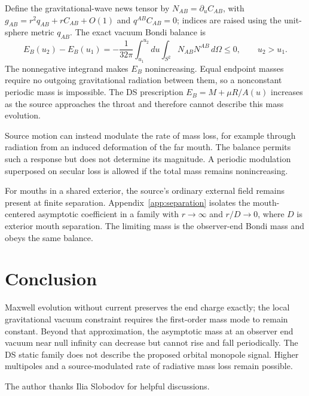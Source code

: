 \documentclass[aps,prd,10pt,onecolumn,nofootinbib,superscriptaddress,floatfix]{revtex4-2}
\begin{document}
Define the gravitational-wave news tensor by $N_{AB}=\partial_u C_{AB}$,
with $g_{AB}=r^2q_{AB}+rC_{AB}+O(1)$ and $q^{AB}C_{AB}=0$;
indices are raised using the unit-sphere metric $q_{AB}$.
The exact vacuum Bondi balance is
\cite{BondiVanderBurgMetzner1962Gravitational,Sachs1962Asymptotic,
WaldZoupas2000Conserved}
\begin{equation}
 E_B(u_2)-E_B(u_1)
 =-\frac{1}{32\pi}\int_{u_1}^{u_2}du
    \int_{S^2}N_{AB}N^{AB}\,d\Omega\le0,
 \qquad u_2>u_1.
 \label{eq:bondi-integrated}
\end{equation}
The nonnegative integrand makes $E_B$ nonincreasing.
Equal endpoint masses require no outgoing gravitational radiation between
them, so a nonconstant periodic mass is impossible.
The DS prescription $E_B=M+\mu R/A(u)$ increases as the source approaches
the throat and therefore cannot describe this mass evolution.

Source motion can instead modulate the rate of mass loss, for example
through radiation from an induced deformation of the far mouth.
The balance permits such a response but does not determine its magnitude.
A periodic modulation superposed on secular loss is allowed if the total
mass remains nonincreasing.

For mouths in a shared exterior, the source's ordinary external field
remains present at finite separation.  Appendix~\ref{app:separation}
isolates the mouth-centered asymptotic coefficient in a family with
$r\to\infty$ and $r/D\to0$, where $D$ is exterior mouth separation.
The limiting mass is the observer-end Bondi mass and obeys the same balance.

\section{Conclusion}
\label{sec:conclusion}

Maxwell evolution without current preserves the end charge
exactly; the local gravitational vacuum constraint requires the first-order
mass mode to remain constant.  Beyond that approximation, the asymptotic mass at an
observer end vacuum near null infinity can decrease but cannot rise and
fall periodically.  The DS static family does not describe the proposed
orbital monopole signal.  Higher multipoles and a source-modulated rate
of radiative mass loss remain possible.

\begin{acknowledgments}
The author thanks Ilia Slobodov for helpful discussions.
\end{acknowledgments}
\end{document}

